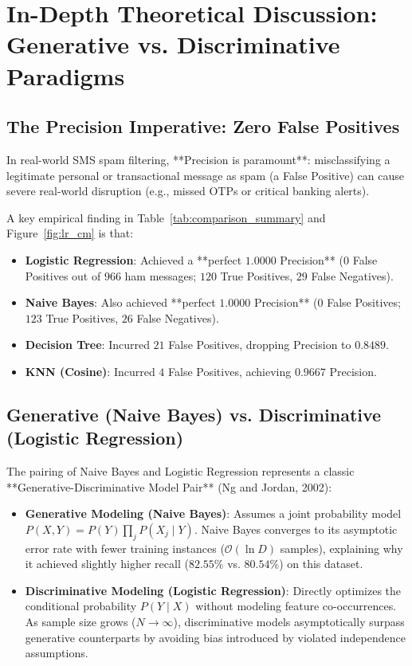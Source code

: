 \documentclass[12pt]{article}
\begin{document}
\newpage
\section{In-Depth Theoretical Discussion: Generative vs. Discriminative Paradigms}

\subsection{The Precision Imperative: Zero False Positives}
In real-world SMS spam filtering, **Precision is paramount**: misclassifying a legitimate personal or transactional message as spam (a False Positive) can cause severe real-world disruption (e.g., missed OTPs or critical banking alerts). 

A key empirical finding in Table~\ref{tab:comparison_summary} and Figure~\ref{fig:lr_cm} is that:
\begin{itemize}
    \item \textbf{Logistic Regression}: Achieved a **perfect $1.0000$ Precision** ($0$ False Positives out of $966$ ham messages; $120$ True Positives, $29$ False Negatives).
    \item \textbf{Naive Bayes}: Also achieved **perfect $1.0000$ Precision** ($0$ False Positives; $123$ True Positives, $26$ False Negatives).
    \item \textbf{Decision Tree}: Incurred $21$ False Positives, dropping Precision to $0.8489$.
    \item \textbf{KNN (Cosine)}: Incurred $4$ False Positives, achieving $0.9667$ Precision.
\end{itemize}

\subsection{Generative (Naive Bayes) vs. Discriminative (Logistic Regression)}
The pairing of Naive Bayes and Logistic Regression represents a classic **Generative-Discriminative Model Pair** (Ng and Jordan, 2002):
\begin{itemize}
    \item \textbf{Generative Modeling (Naive Bayes)}: Assumes a joint probability model $P(X, Y) = P(Y) \prod_j P(X_j \mid Y)$. Naive Bayes converges to its asymptotic error rate with fewer training instances ($\mathcal{O}(\ln D)$ samples), explaining why it achieved slightly higher recall ($82.55\%$ vs. $80.54\%$) on this dataset.
    \item \textbf{Discriminative Modeling (Logistic Regression)}: Directly optimizes the conditional probability $P(Y \mid X)$ without modeling feature co-occurrences. As sample size grows ($N \to \infty$), discriminative models asymptotically surpass generative counterparts by avoiding bias introduced by violated independence assumptions.
\end{itemize}
\end{document}

